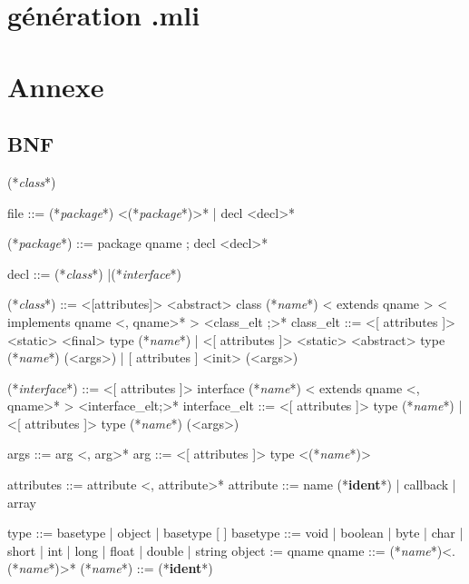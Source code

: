 \documentclass[a4paper, 11pt]{report}
\newcommand{\class}{\ttfamily\textit{class}}
\newcommand{\interface}{\ttfamily\textit{interface}}
\newcommand{\name}{\ttfamily\textit{name}}
\newcommand{\package}{\ttfamily\textit{package}}
\newcommand{\ident}{\footnotesize\textbf{ident}}
\begin{document}
\section{génération .mli}
 














\newpage
\section*{Annexe}


\subsection*{BNF}
\begin{idl}
(*\class*)

file ::= (*\package*) <(*\package*)>*
  	| decl <decl>*
 
(*\package*) ::= package qname ; decl <decl>*

decl ::= (*\class*)
  	|(*\interface*)
 
(*\class*) ::= <[attributes]> <abstract> class (*\name*)
  	  < extends qname >
  	  < implements qname <, qname>* >
  	  { <class_elt ;>* }
class_elt ::= <[ attributes ]> <static> <final> type (*\name*)
            | <[ attributes ]> <static> <abstract> type (*\name*) (<args>)
            | [ attributes ] <init> (<args>)
 
(*\interface*) ::= <[ attributes ]> interface (*\name*)
  	       < extends qname <, qname>* >
  	      { <interface_elt;>* }
interface_elt ::= 
     <[ attributes ]> type (*\name*)
   | <[ attributes ]> type (*\name*) (<args>)
 
args ::= arg <, arg>*
arg ::= <[ attributes ]> type <(*\name*)>
 
attributes ::= 	attribute <, attribute>*
attribute ::= name (*\ident*)
  	    | callback
  	    | array
 
type ::= basetype
       | object
       | basetype [ ]
basetype ::= void
           | boolean
           | byte
           | char
           | short
           | int
           | long
           | float
           | double
           | string
object := qname
qname ::= (*\name*)<.(*\name*)>*
(*\name*) ::= (*\ident*)
\end{idl}
\newpage
\end{document}
